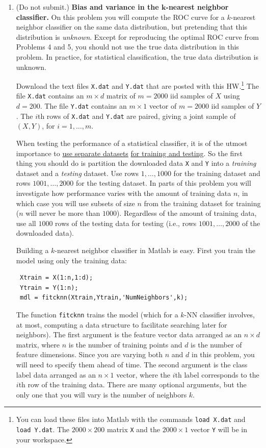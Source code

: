 \documentclass[11pt]{report}
\begin{document}
\begin{enumerate}[1.]
	      \pagebreak


	\item {\color{blue} (Do not submit.)} {\bf Bias and variance in the $\mathbf{k}$-nearest neighbor classifier.}
	      On this problem you will compute the ROC curve for a $k$-nearest neighbor classifier on the same data distribution, but pretending that this  distribution is {\em unknown}.
	      Except for reproducing the optimal ROC curve from Problems 4 and 5, you should not use the true data distribution in this problem. In practice, for statistical classification, the true data distribution is unknown.

	      Download the text files {\tt X.dat} and {\tt Y.dat} that are posted with this HW.\footnote{You can load these files into Matlab with the commands {\tt load X.dat} and {\tt load Y.dat}. The $2000{\times}200$ matrix {\tt X} and the $2000{\times}1$ vector {\tt Y} will be in your workspace.} The file {\tt X.dat} contains an $m\times d$ matrix of $m=2000$ iid samples of $X$ using $d=200$. The file {\tt Y.dat} contains an $m\times 1$ vector of $m=2000$ iid samples of $Y$. The $i$th rows of {\tt X.dat} and {\tt Y.dat} are paired, giving a joint sample of $(X,Y)$, for $i=1,\dotsc,m$.

	      When testing the performance of a statistical classifier, it is of the utmost importance to \underline{use separate datasets} \underline{for training and testing}. So the first thing you should do is partition the downloaded data {\tt X} and {\tt Y} into a {\em training} dataset and a {\em testing} dataset. Use rows $1,\dotsc,1000$ for the training dataset and rows $1001,\dotsc,2000$ for the testing dataset. In parts of this problem you will investigate how performance varies with the amount of training data $n$, in which case you will use subsets of size $n$ from the training dataset for training ($n$ will never be more than $1000$). Regardless of the amount of training data, use all $1000$ rows of the testing data for testing (i.e., rows $1001,\dotsc,2000$ of the downloaded data).

	      Building a $k$-nearest neighbor classifier in Matlab is easy. First you train the model using only the training data:
	      \begin{verbatim}
 Xtrain = X(1:n,1:d); 
 Ytrain = Y(1:n);
 mdl = fitcknn(Xtrain,Ytrain,'NumNeighbors',k);
 \end{verbatim}
	      The function {\tt fitcknn} trains the model (which for a $k$-NN classifier involves, at most, computing a data structure to facilitate searching later for neighbors). The first argument is the feature vector data arranged as an $n\times d$ matrix, where $n$ is the number of training points and $d$ is the number of feature dimensions. Since you are varying both $n$ and $d$ in this problem, you will need to specify them ahead of time. The second argument is the class label data arranged as an $n\times 1$ vector, where the $i$th label corresponds to the $i$th row of the training data. There are many optional arguments, but the only one that you will vary is the number of neighbors $k$.


\end{enumerate}
\end{document}
